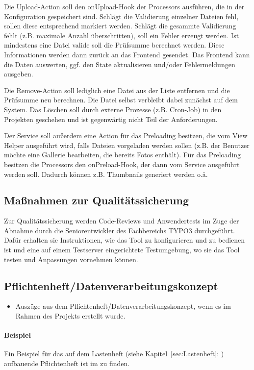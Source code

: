 Die Upload-Action soll den onUpload-Hook der Processors ausführen, die in der Konfiguration gespeichert sind. Schlägt die Validierung einzelner Dateien fehl, sollen diese entsprechend markiert werden. Schlägt die gesammte Validierung fehlt (z.B. maximale Anzahl überschritten), soll ein Fehler erzeugt werden. Ist mindestens eine Datei valide soll die Prüfsumme berechnet werden. Diese Informationen werden dann zurück an das Frontend gesendet. Das Frontend kann die Daten auswerten, ggf. den State aktualisieren und/oder Fehlermeldungen ausgeben.

Die Remove-Action soll lediglich eine Datei aus der Liste entfernen und die Prüfsumme neu berechnen. Die Datei selbst verbleibt dabei zunächst auf dem System. Das Löschen soll durch externe Prozesse (z.B. Cron-Job) in den Projekten geschehen und ist gegenwärtig nicht Teil der Anforderungen.

Der Service soll außerdem eine Action für das Preloading besitzen, die vom View Helper ausgeführt wird, falls Dateien vorgeladen werden sollen (z.B. der Benutzer möchte eine Gallerie bearbeiten, die bereits Fotos enthält). Für das Preloading besitzen die Processors den onPreload-Hook, der dann vom Service ausgeführt werden soll. Dadurch können z.B. Thumbnails generiert werden o.ä.

\subsection{Maßnahmen zur Qualitätssicherung}

Zur Qualitätssicherung werden Code-Reviews und Anwendertests im Zuge der Abnahme durch die Seniorentwickler des Fachbereichs TYPO3 durchgeführt. Dafür erhalten sie Instruktionen, wie das Tool zu konfigurieren und zu bedienen ist und eine auf einem Testserver eingerichtete Testumgebung, wo sie das Tool testen und Anpassungen vornehmen können.


\subsection{Pflichtenheft/Datenverarbeitungskonzept}
\label{sec:Pflichtenheft}
\begin{itemize}
	\item Auszüge aus dem Pflichtenheft/Datenverarbeitungskonzept, wenn es im Rahmen des Projekts erstellt wurde.
\end{itemize}

\paragraph{Beispiel}
Ein Beispiel für das auf dem Lastenheft (siehe Kapitel~\ref{sec:Lastenheft}: ) aufbauende Pflichtenheft ist im  zu finden.
